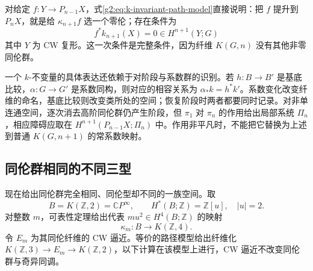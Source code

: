 \ProseParagraphBreak

对给定 \(f:Y\to P_{n-1}X\)，式\eqref{g2:eq:k-invariant-path-model}直接说明：把 \(f\) 提升到 \(P_nX\)，就是给 \(\kappa_{n+1}f\) 选一个零伦；存在条件为
\begin{equation}\label{g2:eq:postnikov-lift-obstruction}
	f^*k_{n+1}(X)=0\in H^{n+1}(Y;G)
\end{equation}
其中 \(Y\) 为 CW 复形。这一次条件是完整条件，因为纤维 \(K(G,n)\) 没有其他非零同伦群。

\ProseParagraphBreak

一个 \(k\)-不变量的具体表达还依赖于对阶段与系数群的识别。若 \(h:B\to B'\) 是基底比较，\(\alpha:G\to G'\) 是系数同构，则对应的相容关系为 \(\alpha_*k=h^*k'\)。系数变化改变纤维的命名，基底比较则改变类所处的空间；恢复阶段时两者都要同时记录。对非单连通空间，逐次消去高阶同伦群仍产生阶段，但 \(\pi_1\) 对 \(\pi_n\) 的作用给出局部系统 \(\Pi_n\)，相应障碍应取在 \(H^{n+1}(P_{n-1}X;\Pi_n)\) 中。作用非平凡时，不能把它替换为上述到普通 \(K(G,n+1)\) 的常系数映射。

\subsection{同伦群相同的不同三型}
\label{g2:subsec:1203:04}

现在给出同伦群完全相同、同伦型却不同的一族空间。取
\[
	B=K(\mathbb Z,2)=\mathbb CP^\infty,\qquad H^*(B;\mathbb Z)=\mathbb Z[u],\quad |u|=2.
\]
对整数 \(m\)，可表性定理给出代表 \(m u^2\in H^4(B;\mathbb Z)\) 的映射
\[
	\kappa_m:B\longrightarrow K(\mathbb Z,4).
\]
令 \(E_m\) 为其同伦纤维的 CW 逼近。等价的路径模型给出纤维化 \(K(\mathbb Z,3)\to E_m\to K(\mathbb Z,2)\)，以下计算在该模型上进行，CW 逼近不改变同伦群与奇异同调。

